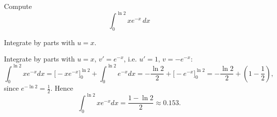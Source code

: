 
\begin{question}
Compute
\[ \int_0^{\ln2}xe^{-x}\,dx \]
\end{question}

\begin{hint}
Integrate by parts with $u=x$.
\end{hint}

\begin{solution}
Integrate by parts with $u=x$, $v'=e^{-x}$, i.e. $u'=1$, $v=-e^{-x}$:
\[ \int_0^{\ln2}xe^{-x}dx=\Big[-xe^{-x}\Big]_0^{\ln2}+\int_0^{\ln2}e^{-x}dx=-\frac{\ln2}{2}+\Big[-e^{-x}\Big]_0^{\ln2}=-\frac{\ln2}{2}+\left(1-\frac12\right), \]
since $e^{-\ln2}=\frac12$. Hence
\[ \int_0^{\ln2}xe^{-x}dx=\boxed{\frac{1-\ln2}{2}}\approx0.153. \]
\end{solution}
